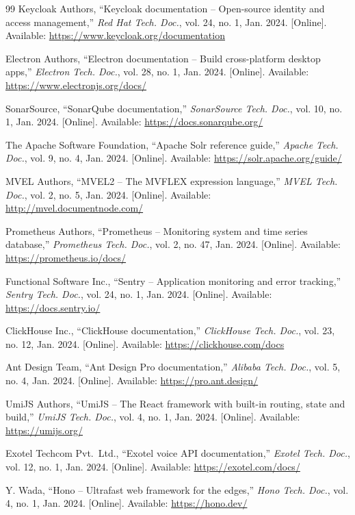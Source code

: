 \begin{thebibliography}{99}
Keycloak Authors, ``Keycloak documentation -- Open-source identity and access management,'' \emph{Red Hat Tech. Doc.}, vol. 24, no. 1, Jan. 2024. [Online]. Available: \url{https://www.keycloak.org/documentation}

Electron Authors, ``Electron documentation -- Build cross-platform desktop apps,'' \emph{Electron Tech. Doc.}, vol. 28, no. 1, Jan. 2024. [Online]. Available: \url{https://www.electronjs.org/docs/}

SonarSource, ``SonarQube documentation,'' \emph{SonarSource Tech. Doc.}, vol. 10, no. 1, Jan. 2024. [Online]. Available: \url{https://docs.sonarqube.org/}

The Apache Software Foundation, ``Apache Solr reference guide,'' \emph{Apache Tech. Doc.}, vol. 9, no. 4, Jan. 2024. [Online]. Available: \url{https://solr.apache.org/guide/}

MVEL Authors, ``MVEL2 -- The MVFLEX expression language,'' \emph{MVEL Tech. Doc.}, vol. 2, no. 5, Jan. 2024. [Online]. Available: \url{http://mvel.documentnode.com/}

Prometheus Authors, ``Prometheus -- Monitoring system and time series database,'' \emph{Prometheus Tech. Doc.}, vol. 2, no. 47, Jan. 2024. [Online]. Available: \url{https://prometheus.io/docs/}

Functional Software Inc., ``Sentry -- Application monitoring and error tracking,'' \emph{Sentry Tech. Doc.}, vol. 24, no. 1, Jan. 2024. [Online]. Available: \url{https://docs.sentry.io/}

ClickHouse Inc., ``ClickHouse documentation,'' \emph{ClickHouse Tech. Doc.}, vol. 23, no. 12, Jan. 2024. [Online]. Available: \url{https://clickhouse.com/docs}

Ant Design Team, ``Ant Design Pro documentation,'' \emph{Alibaba Tech. Doc.}, vol. 5, no. 4, Jan. 2024. [Online]. Available: \url{https://pro.ant.design/}

UmiJS Authors, ``UmiJS -- The React framework with built-in routing, state and build,'' \emph{UmiJS Tech. Doc.}, vol. 4, no. 1, Jan. 2024. [Online]. Available: \url{https://umijs.org/}

Exotel Techcom Pvt.\ Ltd., ``Exotel voice API documentation,'' \emph{Exotel Tech. Doc.}, vol. 12, no. 1, Jan. 2024. [Online]. Available: \url{https://exotel.com/docs/}

Y. Wada, ``Hono -- Ultrafast web framework for the edges,'' \emph{Hono Tech. Doc.}, vol. 4, no. 1, Jan. 2024. [Online]. Available: \url{https://hono.dev/}


\end{thebibliography}
